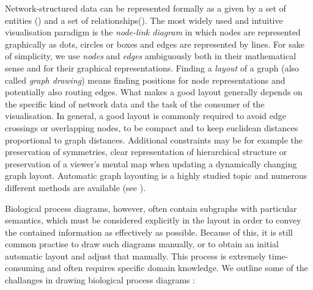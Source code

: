 \documentclass[
	fontsize=10pt, %
	twoside=false, %
	secnumdepth=1, %
  toc=indentunnumbered %
]{kaobook}
\begin{document}
Network-structured data can be represented formally as a  given by a
set of entities () and a set of relationships().
%
The most widely used and intuitive visualisation paradigm is the
\textit{node-link diagram} in which nodes are represented graphically as dots,
circles or boxes and edges are represented by lines. For sake of simplicity, we
use \textit{nodes} and \textit{edges} ambiguously both in their mathematical
sense and for their graphical representations.
%
Finding a \textit{layout} of a graph (also called \textit{graph drawing}) means
finding positions for node representations and potentially also routing edges.
%
What makes a good layout generally depends on the specific kind of network data and the
task of the consumer of the visualisation.
%
In general, a good layout is commonly required to avoid edge crossings or
overlapping nodes, to be compact and to keep euclidean distances proportional to
graph distances.
Additional constraints may be for example the preservation of symmetries, clear
representation of hierarchical structure or preservation of a viewer's mental map when
updating a dynamically changing graph layout.
%
Automatic graph layouting is a highly studied topic and numerous different
methods are available (see ).

Biological process diagrams, however, often contain subgraphs with particular
semantics, which must be considered explicitly in the layout in order to convey
the contained information as effectively as possible.
Because of this, it is still common practise to draw such diagrams manually,
or to obtain an initial automatic layout and adjust that manually. This process is
extremely time-consuming and often requires specific domain knowledge.
We outline some of the challanges in drawing biological process diagrams
\cite{bourqui_MetabolicNetworkVisualization_2007,
  siebenhaller_HumanlikeLayoutAlgorithms_2020,
  wu_MetabopolisScalableNetwork_2019}:

\end{document}
